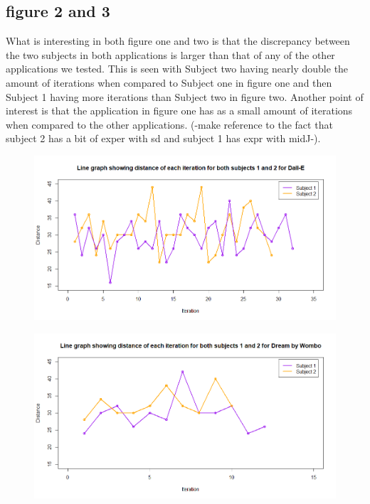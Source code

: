 \documentclass[]{report}
\begin{document}
\subsection{figure 2 and 3}

What is interesting in both figure one and two is that the discrepancy between the two subjects in both applications is larger than that of any of the other applications we tested. This is seen with Subject two having nearly double the amount of iterations when compared to Subject one in figure one and then Subject 1 having more iterations than Subject two in figure two. Another point of interest is that the application in figure one has as a small amount of iterations when compared to the other applications.  (-make reference to the fact that subject 2 has a bit of exper with sd and subject 1 has expr with midJ-).

\begin{figure}[!htbp]
	\centering
	\includegraphics[width=1\linewidth]{LineGraphDall-E}
	\caption{}
	\label{fig:linegraphdall-e}
\end{figure}

\begin{figure}[!htbp]
	\centering
	\includegraphics[width=1\linewidth]{LineGraphDBW}
	\caption{}
	\label{fig:linegraphdbw}
\end{figure}
\end{document}
